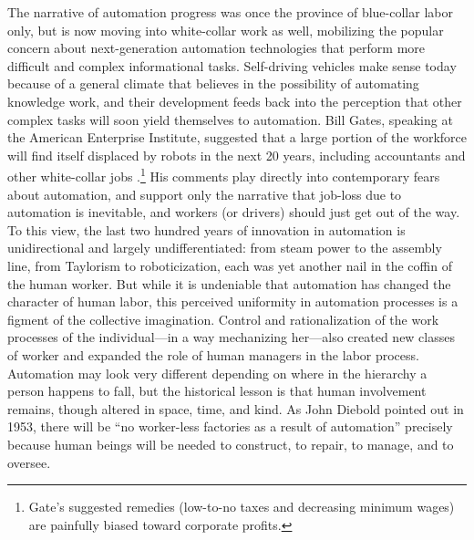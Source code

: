 The narrative of automation progress was once the province of
blue-collar labor only, but is now moving into white-collar work as
well, mobilizing the popular concern about next-generation
automation technologies that perform more difficult and complex
informational tasks. Self-driving vehicles make sense today because of
a general climate that believes in the possibility of automating
knowledge work, and their development feeds back into the perception
that other complex tasks will soon yield themselves to automation. Bill
Gates, speaking at the American Enterprise Institute,
suggested that a large portion of the workforce will find itself
displaced by robots in the next 20 years, including accountants and
other white-collar
jobs \cite{gatesRobots}.\footnote{Gate's suggested remedies (low-to-no taxes and decreasing minimum
wages) are painfully biased toward corporate profits.}
His comments play directly into
contemporary fears about automation, and support only the
narrative that job-loss due to automation is inevitable, and workers
(or drivers)
should just get out of the way. To this view, the last two hundred
years of innovation in automation is unidirectional and largely
undifferentiated:  from steam power to the assembly line, from
Taylorism to roboticization, each was yet another nail in the coffin
of the human worker. But
while it is undeniable that automation has changed the
character of human labor, this perceived uniformity in automation
processes is a figment of the collective imagination. Control and
rationalization of
the work processes of the individual---in a way mechanizing her---also
created new classes of worker and expanded the role of human managers
in the labor process. Automation may look very
different depending on where in the hierarchy 
a person happens to fall, but the historical lesson is that human
involvement remains, though altered in space, time, and kind. As John
Diebold pointed out in 1953, there will be ``no worker-less
factories as a result of automation'' \cite[p. 63-64]{dieboldNew}
precisely because human beings will be needed to construct, to repair,
to manage, and to oversee.

